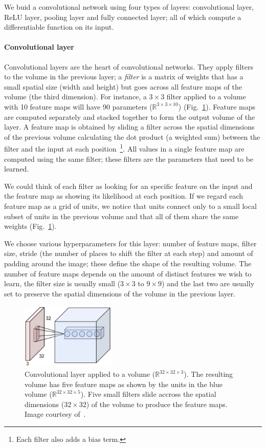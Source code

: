 We buid a convolutional network using four types of layers: convolutional layer, ReLU layer, pooling layer and fully connected layer; all of which compute a differentiable function on its input.

\paragraph{Convolutional layer} Convolutional layers are the heart of convolutional networks. They apply filters to the volume in the previous layer; a \emph{filter} is a matrix of weights that has a small spatial size (width and height) but goes across all feature maps of the volume (the third dimension). For instance, a $3\times 3$ filter applied to a volume with 10 feature maps will have 90 parameters ($\mathbb{R}^{3\times3\times10}$) (Fig.~\ref{fig:ConvLayer}).
Feature maps are computed separately and stacked together to form the output volume of the layer. A feature map is obtained by sliding a filter across the spatial dimensions of the previous volume calculating the dot product (a weighted sum) between the filter and the input at each position~\footnote{Each filter also adds a bias term.}.
All values in a single feature map are computed using the same filter; these filters are the parameters that need to be learned.

We could think of each filter as looking for an specific feature on the input and the feature map as showing its likelihood at each position. If we regard each feature map as a grid of units, we notice that units connect only to a small local subset of units in the previous volume and that all of them share the same weights (Fig.~\ref{fig:ConvLayer}).

We choose various hyperparameters for this layer: number of feature maps, filter size, stride (the number of places to shift the filter at each step) and amount of padding around the image; these define the shape of the resulting volume. The number of feature maps depends on the amount of distinct features we wish to learn, the filter size is usually small ($3\times3$ to $9\times9$) and the last two are usually set to preserve the spatial dimensions of the volume in the previous layer.
\begin{figure}[h]
	\centering
	\includegraphics[width = 0.4\textwidth]{plots/convLayer.jpeg}
	\caption[Convolutional layer applied to a volume]{Convolutional layer applied to a volume ($\mathbb{R}^{32\times 32\times 3}$). The resulting volume has five feature maps as shown by the units in the blue volume ($\mathbb{R}^{32\times 32\times 5}$). Five small filters slide accross the spatial dimensions ($32\times 32$) of the volume to produce the feature maps. Image courtesy of~\cite{Karpathy2015}.}
	\label{fig:ConvLayer}
\end{figure}


